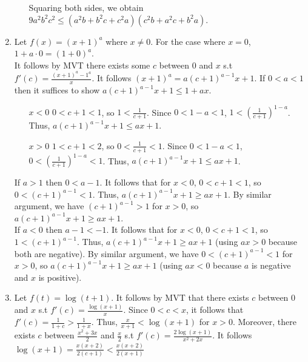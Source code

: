 \documentclass[10pt]{article}
\begin{document}
\begin{enumerate}[label= (Q-\arabic*)]
\begin{itemize}
        Squaring both sides, we obtain $9a^2 b^2 c^2\le(a^2b+b^2c+c^2a)(c^2b+a^2c+b^2a)$.
    \end{itemize}
        \item Let $f(x)={(x+1)}^a$ where $x\neq0$. For the case where $x=0$, $1+a\cdot0={(1+0)}^a$.\\
         It follows by MVT there exists some $c$ between $0$ and $x$ s.t $f'(c)=\frac{{(x+1)}^a-1^a}{x}$. 
        It follows ${(x+1)}^a=a{(c+1)}^{a-1}x+1$. 
        If $0<a<1$ then it suffices to show $a{(c+1)}^{a-1}x+1\le 1+ax$.\\
        \begin{itemize}
            \item [$x<0$] $0<c+1<1$, so $1<\frac{1}{c+1}$. Since $0<1-a<1$, $1<{(\frac{1}{c+1})}^{1-a}$. Thus, $a{(c+1)}^{a-1}x+1\le ax+1$.
            \item [$x>0$] $1<c+1<2$, so $0<\frac{1}{c+1}<1$. Since $0<1-a<1$, $0<{(\frac{1}{c+1})}^{1-a}<1$. Thus, $a{(c+1)}^{a-1}x+1\le ax+1$.
        \end{itemize}
        If $a>1$ then $0<a-1$. It follows that for $x<0$, $0<c+1<1$, so $0<{(c+1)}^{a-1}<1$. Thus, $a{(c+1)}^{a-1}x+1\ge ax+1$. By similar argument, we have ${(c+1)}^{a-1}>1$ for $x>0$, so $a{(c+1)}^{a-1}x+1\ge ax+1$.\\
        If $a<0$ then $a-1<-1$. It follows that for $x<0$, $0<c+1<1$, so $1<{(c+1)}^{a-1}$. Thus, $a{(c+1)}^{a-1}x+1\ge ax+1$ (using $ax>0$ because both are negative). By similar argument, we have $0<{(c+1)}^{a-1}<1$ for $x>0$, so $a{(c+1)}^{a-1}x+1\ge ax+1$ (using $ax<0$ because $a$ is negative and $x$ is positive).
        \item Let $f(t)=\log(t+1)$. It follows by MVT that there exists $c$ between $0$ and $x$ s.t $f'(c)=\frac{\log(x+1)}{x}$. 
        Since $0<c<x$, it follows that $f'(c)=\frac{1}{1+c}>\frac{1}{1+x}$. Thus, $\frac{x}{x+1}<\log(x+1)$ for $x>0$.
        Moreover, there exists $c$ between $\frac{x^2+3x}{2}$ and $\frac{x}{2}$ s.t $f'(c)=\frac{2\log(x+1)}{x^2+2x}$.
        It follows $\log(x+1)=\frac{x(x+2)}{2(c+1)}<\frac{x(x+2)}{2(x+1)}$
       

\end{enumerate}
\end{document}
